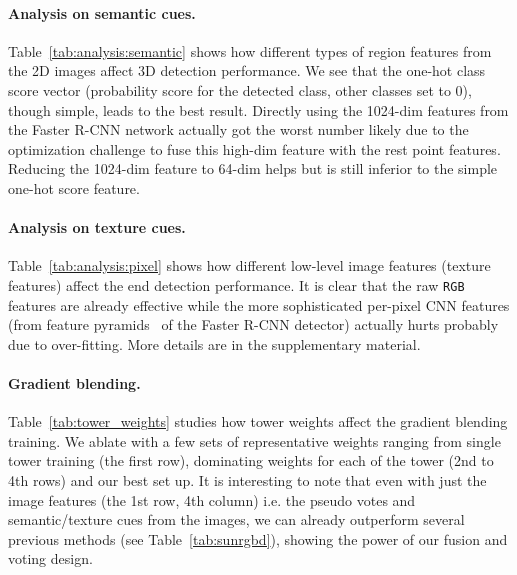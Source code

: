 \documentclass[10pt,twocolumn,letterpaper]{article}
\newcommand{\rgb}{\texttt{RGB}\xspace}
\begin{document}
\paragraph{Analysis on semantic cues.}
Table~\ref{tab:analysis:semantic} shows how different types of region features from the 2D images affect 3D detection performance. We see that the one-hot class score vector (probability score for the detected class, other classes set to 0), though simple, leads to the best result. Directly using the 1024-dim \roi features from the Faster R-CNN network actually got the worst number likely due to the optimization challenge to fuse this high-dim feature with the rest point features. Reducing the 1024-dim feature to 64-dim helps but is still inferior to the simple one-hot score feature.

\paragraph{Analysis on texture cues.} Table~\ref{tab:analysis:pixel} shows how different low-level image features (texture features) affect the end detection performance. It is clear that the raw \rgb features are already effective while the more sophisticated per-pixel CNN features (from feature pyramids~\cite{lin2017feature} of the Faster R-CNN detector) actually hurts probably due to over-fitting. More details are in the supplementary material.

\paragraph{Gradient blending.} 
Table~\ref{tab:tower_weights} studies how tower weights affect the gradient blending training. We ablate with a few sets of representative weights ranging from single tower training (the first row), dominating weights for each of the tower (2nd to 4th rows) and our best set up. It is interesting to note that even with just the image features (the 1st row, 4th column) i.e. the pseudo votes and semantic/texture cues from the images, we can already outperform several previous methods (see Table~\ref{tab:sunrgbd}), showing the power of our fusion and voting design.
\end{document}
